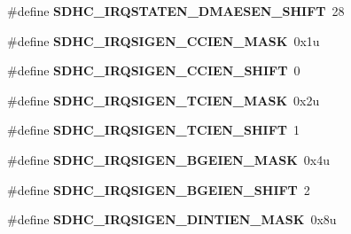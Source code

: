 \begin{DoxyCompactItemize}
\item 
\#define {\bfseries S\+D\+H\+C\+\_\+\+I\+R\+Q\+S\+T\+A\+T\+E\+N\+\_\+\+D\+M\+A\+E\+S\+E\+N\+\_\+\+S\+H\+I\+FT}~28\hypertarget{group__SDHC__Register__Masks_gaeaf5be970bbb56b0ccbae03ece8dede6}{}\label{group__SDHC__Register__Masks_gaeaf5be970bbb56b0ccbae03ece8dede6}

\item 
\#define {\bfseries S\+D\+H\+C\+\_\+\+I\+R\+Q\+S\+I\+G\+E\+N\+\_\+\+C\+C\+I\+E\+N\+\_\+\+M\+A\+SK}~0x1u\hypertarget{group__SDHC__Register__Masks_ga393b56f0275bd461a60df5d1dad40370}{}\label{group__SDHC__Register__Masks_ga393b56f0275bd461a60df5d1dad40370}

\item 
\#define {\bfseries S\+D\+H\+C\+\_\+\+I\+R\+Q\+S\+I\+G\+E\+N\+\_\+\+C\+C\+I\+E\+N\+\_\+\+S\+H\+I\+FT}~0\hypertarget{group__SDHC__Register__Masks_ga7eed6122d048bd5f722d250817adcc96}{}\label{group__SDHC__Register__Masks_ga7eed6122d048bd5f722d250817adcc96}

\item 
\#define {\bfseries S\+D\+H\+C\+\_\+\+I\+R\+Q\+S\+I\+G\+E\+N\+\_\+\+T\+C\+I\+E\+N\+\_\+\+M\+A\+SK}~0x2u\hypertarget{group__SDHC__Register__Masks_ga18f4e41f80857c3a86c3ee99dad7fef0}{}\label{group__SDHC__Register__Masks_ga18f4e41f80857c3a86c3ee99dad7fef0}

\item 
\#define {\bfseries S\+D\+H\+C\+\_\+\+I\+R\+Q\+S\+I\+G\+E\+N\+\_\+\+T\+C\+I\+E\+N\+\_\+\+S\+H\+I\+FT}~1\hypertarget{group__SDHC__Register__Masks_ga6725fe5d247936a430d035b3860ae9f9}{}\label{group__SDHC__Register__Masks_ga6725fe5d247936a430d035b3860ae9f9}

\item 
\#define {\bfseries S\+D\+H\+C\+\_\+\+I\+R\+Q\+S\+I\+G\+E\+N\+\_\+\+B\+G\+E\+I\+E\+N\+\_\+\+M\+A\+SK}~0x4u\hypertarget{group__SDHC__Register__Masks_ga56ccc2a22e90f8d92cf3a7ad63791861}{}\label{group__SDHC__Register__Masks_ga56ccc2a22e90f8d92cf3a7ad63791861}

\item 
\#define {\bfseries S\+D\+H\+C\+\_\+\+I\+R\+Q\+S\+I\+G\+E\+N\+\_\+\+B\+G\+E\+I\+E\+N\+\_\+\+S\+H\+I\+FT}~2\hypertarget{group__SDHC__Register__Masks_ga4a14bf5315dcb669dc529920384cdf97}{}\label{group__SDHC__Register__Masks_ga4a14bf5315dcb669dc529920384cdf97}

\item 
\#define {\bfseries S\+D\+H\+C\+\_\+\+I\+R\+Q\+S\+I\+G\+E\+N\+\_\+\+D\+I\+N\+T\+I\+E\+N\+\_\+\+M\+A\+SK}~0x8u\hypertarget{group__SDHC__Register__Masks_ga9414ef10609a933fd60a109700f44498}{}\label{group__SDHC__Register__Masks_ga9414ef10609a933fd60a109700f44498}


\end{DoxyCompactItemize}
